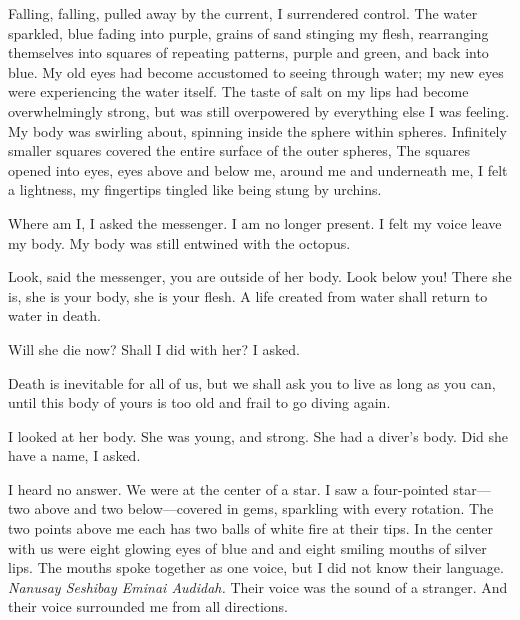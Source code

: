 \documentclass[12pt, letterpaper]{report}
\begin{document}
\vspace{1\baselineskip}
Falling, falling, pulled away by the current, I surrendered control. The water sparkled, blue fading into purple, grains of sand stinging my flesh, rearranging themselves into squares of repeating patterns, purple and green, and back into blue. My old eyes had become accustomed to seeing through water; my new eyes were experiencing the water itself. The taste of salt on my lips had become overwhelmingly strong, but was still overpowered by everything else I was feeling. My body was swirling about, spinning inside the sphere within spheres. Infinitely smaller squares covered the entire surface of the outer spheres, The squares opened into eyes, eyes above and below me, around me and underneath me, I felt a lightness, my fingertips tingled like being stung by urchins.

\vspace{1\baselineskip}
Where am I, I asked the messenger. I am no longer present. I felt my voice leave my body. My body was still entwined with the octopus.

\vspace{1\baselineskip}
Look, said the messenger, you are outside of her body. Look below you! There she is, she is your body, she is your flesh. A life created from water shall return to water in death. 

\vspace{1\baselineskip}
Will she die now? Shall I did with her? I asked.

\vspace{1\baselineskip}
Death is inevitable for all of us, but we shall ask you to live as long as you can, until this body of yours is too old and frail to go diving again.

\vspace{1\baselineskip}
I looked at her body. She was young, and strong. She had a diver's body. Did she have a name, I asked.

\vspace{1\baselineskip}
I heard no answer. We were at the center of a star. I saw a four-pointed star---two above and two below---covered in gems, sparkling with every rotation. The two points above me each has two balls of white fire at their tips. In the center with us were eight glowing eyes of blue and and eight smiling mouths of silver lips. The mouths spoke together as one voice, but I did not know their language. \textit{Nanusay Seshibay Eminai Audidah.} Their voice was the sound of a stranger. And their voice surrounded me from all directions.
\end{document}
